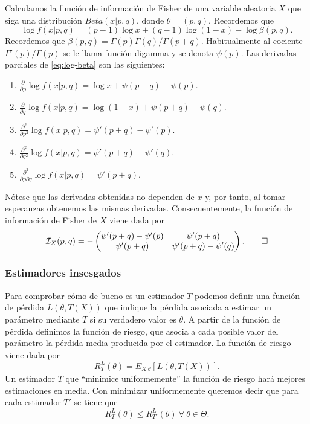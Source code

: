 \documentclass{article}
\begin{document}
    \begin{ex}
        Calculamos la función de información de Fisher de una variable aleatoria $X$ que siga una distribución $Beta(x | p, q)$, donde $\theta = (p, q)$. Recordemos que
        \begin{equation} \label{eq:log-beta}
            \log f(x | p, q) = (p-1) \log x + (q-1) \log (1-x) - \log \beta(p, q).
        \end{equation}
        Recordemos que $\beta(p,q) = \Gamma(p) \Gamma(q) / \Gamma(p+q)$. Habitualmente al cociente $\Gamma'(p)/\Gamma(p)$ se le llama función digamma y se denota $\psi(p)$. Las derivadas parciales de \eqref{eq:log-beta} son las siguientes:
        \begin{enumerate}
            \item $\frac{\partial}{\partial p} \log f(x | p, q) = \log x + \psi(p+q) - \psi(p).$
            \item $\frac{\partial}{\partial q} \log f(x | p, q) = \log(1-x) + \psi(p+q) - \psi(q).$
            \item $\frac{\partial^2}{\partial p^2} \log f(x | p, q) = \psi'(p+q) - \psi'(p).$
            \item $\frac{\partial^2}{\partial q^2} \log f(x | p, q) = \psi'(p+q) - \psi'(q).$
            \item $\frac{\partial^2}{\partial p\partial q} \log f(x | p, q) = \psi'(p+q).$
        \end{enumerate}

        Nótese que las derivadas obtenidas no dependen de $x$ y, por tanto, al tomar esperanzas obtenemos las mismas derivadas. Consecuentemente, la función de información de Fisher de $X$ viene dada por
        \[\mathcal{I}_X(p, q) = - \left(\begin{matrix} \psi'(p+q) - \psi'(p) & \psi'(p+q) \\ \psi'(p+q) & \psi'(p+q) - \psi'(q) \end{matrix}\right). \qedhere\]

    \end{ex}

    \subsubsection{Estimadores insesgados}

    Para comprobar cómo de bueno es un estimador $T$ podemos definir una función de pérdida $L(\theta,T(X))$ que indique la pérdida asociada a estimar un parámetro mediante $T$ si su verdadero valor es $\theta$. A partir de la función de pérdida definimos la función de riesgo, que asocia a cada posible valor del parámetro la pérdida media producida por el estimador. La función de riesgo viene dada por
    \[ R^L_T(\theta) = E_{X|\theta} [L(\theta,T(X))].\]
    Un estimador $T$ que ``minimice uniformemente'' la función de riesgo hará mejores estimaciones en media. Con minimizar uniformemente queremos decir que para cada estimador $T'$ se tiene que
    \[ R^L_T(\theta) \leq R^L_{T'}(\theta) \ \forall \ \theta \in \Theta.\]
\end{document}
